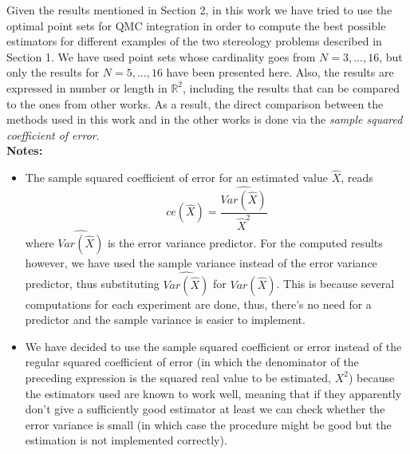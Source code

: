 Given the results mentioned in Section 2, in this work we have tried to use the optimal point sets for QMC integration in order to compute the best possible estimators for different examples of the two stereology problems described in Section 1. We have used point sets whose cardinality goes from $N=3,...,16$, but only the results for $N=5,...,16$ have been presented here. Also, the results are expressed in number or length in $\mathbb{R}^2$, including the results that can be compared to the ones from other works. As a result, the direct comparison between the methods used in this work and in the other works is done via the \textit{sample squared coefficient of error}.\\

\textbf{Notes:} 
\begin{itemize}
    \item The sample squared coefficient of error for an estimated value $\widehat{X}$, reads
    \begin{equation} \label{squaredCE}
        ce(\widehat{X}) = \frac{\widehat{Var(\widehat{X})}}{\widehat{X}^2}
    \end{equation}
    where $\widehat{Var(\widehat{X})}$ is the error variance predictor. For the computed results however, we have used the sample variance instead of the error variance predictor, thus substituting $\widehat{Var(\widehat{X})}$ for $Var(\widehat{X})$. This is because several computations for each experiment are done, thus, there's no need for a predictor and the sample variance is easier to implement.

    \item We have decided to use the sample squared coefficient or error instead of the regular squared coefficient of error (in which the denominator of the preceding expression is the squared real value to be estimated, $X^2$) because the estimators used are known to work well, meaning that if they apparently don't give a sufficiently good estimator at least we can check whether the error variance is small (in which case the procedure might be good but the estimation is not implemented correctly).
\end{itemize}


